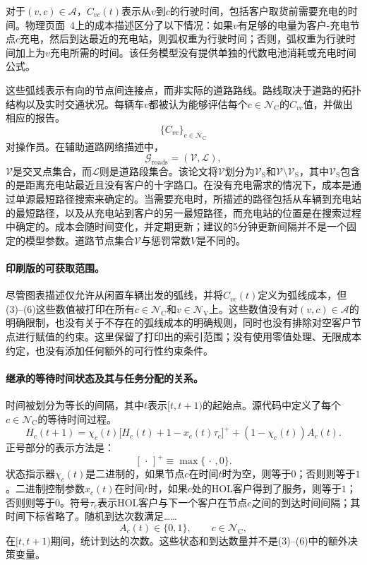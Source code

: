 \documentclass{article}
\begin{document}
对于$(v,c)\in\mathcal A$，$C_{vc}(t)$表示从$v$到$c$的行驶时间，包括客户取货前需要充电的时间。物理页面~4上的成本描述区分了以下情况：如果$v$有足够的电量为客户-充电节点$c$充电，然后到达最近的充电站，则弧权重为行驶时间；否则，弧权重为行驶时间加上为$v$充电所需的时间。该任务模型没有提供单独的代数电池消耗或充电时间公式。

这些弧线表示有向的节点间连接点，而非实际的道路路线。路线取决于道路的拓扑结构以及实时交通状况。每辆车$v$都被认为能够评估每个$c\in\mathcal N_{\mathrm C}$的$C_{vc}$值，并做出相应的报告。
\[
\{C_{vc}\}_{c\in\mathcal N_{\mathrm C}}
\]
对操作员。在辅助道路网络描述中，
\[
\mathcal G_{\mathrm{roads}}=(\mathcal V,\mathcal L),
\]
$\mathcal V$是交叉点集合，而$\mathcal L$则是道路段集合。该论文将$\mathcal V$划分为$\mathcal V_{\mathrm S}$和$\mathcal V\setminus\mathcal V_{\mathrm S}$，其中$\mathcal V_{\mathrm S}$包含的是距离充电站最近且没有客户的十字路口。在没有充电需求的情况下，成本是通过单源最短路径搜索来确定的。当需要充电时，所描述的路径包括从车辆到充电站的最短路径，以及从充电站到客户的另一最短路径，而充电站的位置是在搜索过程中确定的。成本会随时间变化，并定期更新；建议的5分钟更新间隔并不是一个固定的模型参数。道路节点集合$\mathcal V$与惩罚常数$V$是不同的。

\paragraph{印刷版的可获取范围。}
尽管图表描述仅允许从闲置车辆出发的弧线，并将$C_{vc}(t)$定义为弧线成本，但(3)--(6)这些数值被打印在所有$c\in\mathcal N_{\mathrm C}$和$v\in\mathcal N_{\mathrm V}$上。这些数值没有对$(v,c)\in\mathcal A$的明确限制，也没有关于不存在的弧线成本的明确规则，同时也没有排除对空客户节点进行赋值的约束。这里保留了打印出的索引范围；没有使用零值处理、无限成本约定，也没有添加任何额外的可行性约束条件。

\paragraph{继承的等待时间状态及其与任务分配的关系。}
时间被划分为等长的间隔，其中$t$表示$[t,t+1)$的起始点。源代码中定义了每个$c\in\mathcal N_{\mathrm C}$的等待时间过程。
\begin{equation}
H_c(t+1)=\chi_c(t)\bigl[H_c(t)+1-x_c(t)\tau_c\bigr]^+
 +(1-\chi_c(t))A_c(t). \tag{1}
\end{equation}
正号部分的表示方法是：
\[
[\,\cdot\,]^+\equiv\max\{\,\cdot\,,0\}.
\]
状态指示器$\chi_c(t)$是二进制的，如果节点$c$在时间$t$时为空，则等于$0$；否则则等于$1$。二进制控制参数$x_c(t)$在时间$t$时，如果$c$处的HOL客户得到了服务，则等于$1$；否则则等于$0$。符号$\tau_c$表示HOL客户与下一个客户在节点$c$之间的到达时间间隔；其时间下标省略了。随机到达次数满足……
\[
A_c(t)\in\{0,1\},\qquad c\in\mathcal N_{\mathrm C},
\]
在$[t,t+1)$期间，统计到达的次数。这些状态和到达数量并不是(3)--(6)中的额外决策变量。
\end{document}
